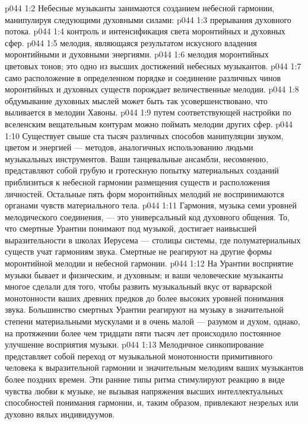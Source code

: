 \vs p044 1:2 Небесные музыканты занимаются созданием небесной гармонии, манипулируя следующими духовными силами:
\vs p044 1:3 \bibnobreakspace {} прерывания духовного потока.
\vs p044 1:4 \bibnobreakspace {} контроль и интенсификация света моронтийных и духовных сфер.
\vs p044 1:5 \bibnobreakspace {} мелодия, являющаяся результатом искусного владения моронтийными и духовными энергиями.
\vs p044 1:6 \bibnobreakspace {} мелодия моронтийных цветовых тонов; это одно из высших достижений небесных музыкантов.
\vs p044 1:7 \bibnobreakspace {} само расположение в определенном порядке и соединение различных чинов моронтийных и духовных существ порождает величественные мелодии.
\vs p044 1:8 \bibnobreakspace {} обдумывание духовных мыслей может быть так усовершенствовано, что выливается в мелодии Хавоны.
\vs p044 1:9 \bibnobreakspace {} путем соответствующей настройки по вселенским вещательным контурам можно поймать мелодии других сфер.
\vs p044 1:10 \pc Существует свыше ста тысяч различных способов манипуляции звуком, цветом и энергией --- методов, аналогичных использованию людьми музыкальных инструментов. Ваши танцевальные ансамбли, несомненно, представляют собой грубую и гротескную попытку материальных созданий приблизиться к небесной гармонии размещения существ и расположения личностей. Остальные пять форм моронтийных мелодий не воспринимаются органами чувств материального тела.
\vs p044 1:11 Гармония, музыка семи уровней мелодического соединения, --- это универсальный код духовного общения. То, что смертные Урантии понимают под музыкой, достигает наивысшей выразительности в школах Иерусема --- столицы системы, где полуматериальных существ учат гармониям звука. Смертные не реагируют на другие формы моронтийной мелодии и небесной гармонии.
\vs p044 1:12 \pc На Урантии восприятие музыки бывает и физическим, и духовным; и ваши человеческие музыканты многое сделали для того, чтобы развить музыкальный вкус от варварской монотонности ваших древних предков до более высоких уровней понимания звука. Большинство смертных Урантии реагируют на музыку в значительной степени материальными мускулами и в очень малой --- разумом и духом, однако, на протяжении более чем тридцати пяти тысяч лет происходило постоянное улучшение восприятия музыки.
\vs p044 1:13 Мелодичное синкопирование представляет собой переход от музыкальной монотонности примитивного человека к выразительной гармонии и значительным мелодиям ваших музыкантов более поздних времен. Эти ранние типы ритма стимулируют реакцию в виде чувства любви к музыке, не вызывая напряжения высших интеллектуальных способностей понимания гармонии, и, таким образом, привлекают незрелых или духовно вялых индивидуумов.
